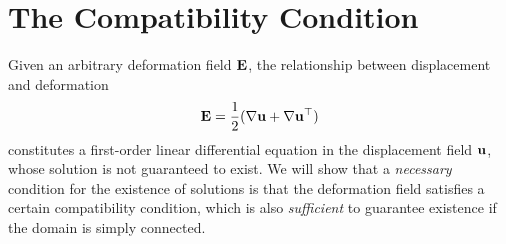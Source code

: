 \section{The Compatibility Condition}

Given an arbitrary deformation field \(\mathbf{E}\), the relationship between displacement and deformation
\begin{equation}
	\mathbf{E} = \frac{1}{2} (\nabla \mathbf{u} + \nabla \mathbf{u}^\top)
\end{equation}
constitutes a first-order linear differential equation in the displacement field \(\mathbf{u}\), whose solution is not guaranteed to exist. We will show that a \textit{necessary} condition for the existence of solutions is that the deformation field satisfies a certain compatibility condition, which is also \textit{sufficient} to guarantee existence if the domain is simply connected.


